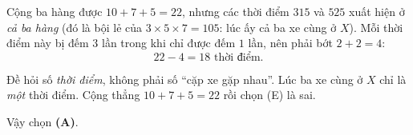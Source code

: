 {
Cộng ba hàng được $10+7+5=22$, nhưng các thời điểm $315$ và $525$ xuất hiện ở \emph{cả ba hàng}
(đó là bội lẻ của $3\times5\times7=105$: lúc ấy cả ba xe cùng ở $X$). Mỗi thời điểm này bị đếm $3$ lần
trong khi chỉ được đếm $1$ lần, nên phải bớt $2+2=4$:
\[22-4=18 \text{ thời điểm.}\]
\begin{warnbox}Đề hỏi số \emph{thời điểm}, không phải số ``cặp xe gặp nhau''. Lúc ba xe cùng ở $X$ chỉ là
\emph{một} thời điểm. Cộng thẳng $10+7+5=22$ rồi chọn (E) là sai.\end{warnbox}
Vậy chọn \textbf{(A)}.
}

